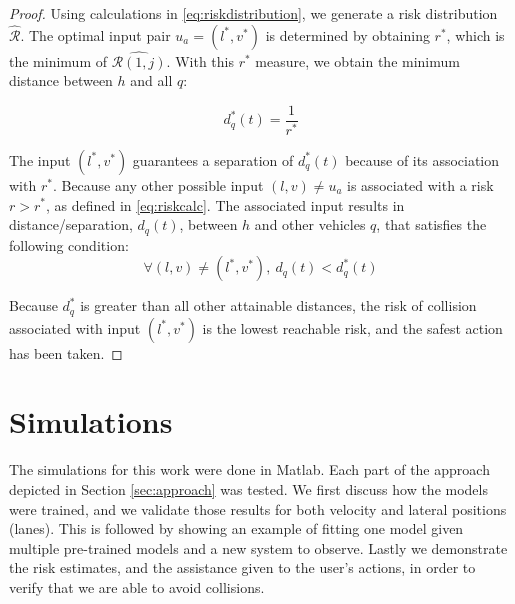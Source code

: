 \documentclass[letterpaper, 10 pt, conference]{ieeeconf}  %
\begin{document}
\begin{proof}
Using calculations in \eqref{eq:riskdistribution}, we generate a risk distribution $\hat{\mathcal{R}}$. The optimal input pair $u_a=(l^*,v^*)$ is determined by obtaining $r^*$, which is the minimum of $\hat{\mathcal{R}(1,j)}$. With this $r^*$ measure, we obtain the minimum distance between $h$ and all $q$:

\begin{equation}
d^*_q(t) = \frac{1}{r^*}
\end{equation}

The input $(l^*,v^*)$ guarantees a separation of $d^*_q(t)$ because of its association with $r^*$. Because any other possible input $(l,v) \neq u_a$ is associated with a risk $r>r^*$, as defined in \eqref{eq:riskcalc}. The associated input results in distance/separation, $d_q(t)$, between $h$ and other vehicles $q$, that satisfies the following condition:
\begin{equation}
\forall{(l,v) \neq (l^*,v^*)},~d_q(t) < d^*_q(t)
\end{equation}

Because $d_q^*$ is greater than all other attainable distances, the risk of collision associated with input $(l^*,v^*)$ is the lowest reachable risk, and the safest action has been taken.

\end{proof}


\section{Simulations} \label{sec:sims}
The simulations for this work were done in Matlab. Each part of the approach depicted in Section \ref{sec:approach} was tested. We first discuss how the models were trained, and we validate those results for both velocity and lateral positions (lanes). This is followed by showing an example of fitting one model given multiple pre-trained models and a new system to observe. Lastly we demonstrate the risk estimates, and the assistance given to the user's actions, in order to verify that we are able to avoid collisions.
\end{document}
